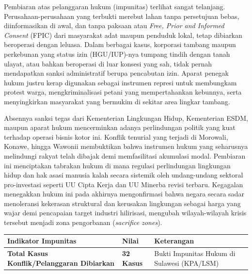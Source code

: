 \documentclass[
]{article}
\newcounter{none} %
\begin{document}
Pembiaran atas pelanggaran hukum (impunitas) terlihat sangat telanjang.
Perusahaan-perusahaan yang terbukti merebut lahan tanpa persetujuan
bebas, diinformasikan di awal, dan tanpa paksaan atau \emph{Free, Prior
and Informed Consent} (FPIC) dari masyarakat adat maupun penduduk lokal,
tetap dibiarkan beroperasi dengan leluasa. Dalam berbagai kasus,
korporasi tambang maupun perkebunan yang status izin (HGU/IUP)-nya
tumpang tindih dengan tanah ulayat, atau bahkan beroperasi di luar
konsesi yang sah, tidak pernah mendapatkan sanksi administratif berupa
pencabutan izin. Aparat penegak hukum justru kerap digunakan sebagai
instrumen represi untuk membungkam protest warga, mengkriminalisasi
petani yang mempertahankan kebunnya, serta menyingkirkan masyarakat yang
bermukim di sekitar area lingkar tambang.

Absennya sanksi tegas dari Kementerian Lingkungan Hidup, Kementerian
ESDM, maupun aparat hukum mencerminkan adanya perlindungan politik yang
kuat terhadap operasi bisnis kotor ini. Konflik tenurial yang terjadi di
Morowali, Konawe, hingga Wawonii membuktikan bahwa instrumen hukum yang
seharusnya melindungi rakyat telah dibajak demi memfasilitasi akumulasi
modal. Pembiaran ini menciptakan tabrakan hukum di mana regulasi
perlindungan lingkungan hidup dan hak asasi manusia kalah secara
sistemik oleh undang-undang sektoral pro-investasi seperti UU Cipta
Kerja dan UU Minerba revisi terbaru. Kegagalan menegakkan hukum ini pada
akhirnya mengonfirmasi bahwa negara secara sadar menoleransi kekerasan
struktural dan kerusakan lingkungan sebagai harga yang wajar demi
pencapaian target industri hilirisasi, mengubah wilayah-wilayah krisis
tersebut menjadi zona pengorbanan (\emph{sacrifice zones}).

{\def\LTcaptype{none} %
\begin{longtable}[]{@{}
  >{\raggedright\arraybackslash}p{}
  >{\raggedright\arraybackslash}p{}
  >{\raggedright\arraybackslash}p{}@{}}
\toprule\noalign{}
\begin{minipage}[b]{\linewidth}\raggedright
Indikator Impunitas
\end{minipage} & \begin{minipage}[b]{\linewidth}\raggedright
Nilai
\end{minipage} & \begin{minipage}[b]{\linewidth}\raggedright
Keterangan
\end{minipage} \\
\midrule\noalign{}
\endhead
\bottomrule\noalign{}
\endlastfoot
\textbf{Total Kasus Konflik/Pelanggaran Dibiarkan} & \textbf{32 Kasus} &
Bukti Impunitas Hukum di Sulawesi (KPA/LSM) \\
\end{longtable}
}
\end{document}
